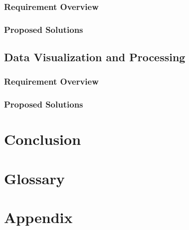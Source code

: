 \documentclass[letterpaper,10pt]{article}
\begin{document}
\subsubsection{Requirement Overview}
\subsubsection{Proposed Solutions}
\subsection{Data Visualization and Processing}
\subsubsection{Requirement Overview}
\subsubsection{Proposed Solutions}

\section{Conclusion}
\section{Glossary}

\section{Appendix}

\end{document}
